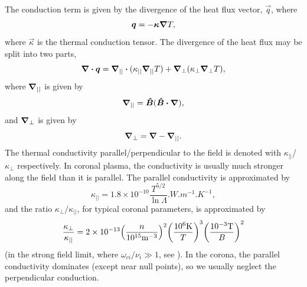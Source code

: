 The conduction term is given by the divergence of the heat flux vector, $\vec{q}$, where
\begin{equation}
    \boldsymbol{q}=-\boldsymbol{\kappa}\grad T,
\end{equation}
where $\vec{\kappa}$ is the thermal conduction tensor. The divergence of the heat flux may be split into two parts,
\begin{equation}
    \div\vec{q}=\grad_{||}\vdot(\kappa_{||}\grad_{||}T)+\grad_{\perp}(\kappa_\perp\grad_\perp T),
\end{equation}
where $\grad_{||}$ is given by
\begin{equation}
    \grad_{||}=\vec{\hat{B}}(\vec{\hat{B}}\vdot\grad),
\end{equation}
and $\grad_\perp$ is given by
\begin{equation}
    \grad_\perp = \grad - \grad_{||}.
\end{equation}
The thermal conductivity parallel/perpendicular to the field is denoted with $\kappa_{||}$/$\kappa_\perp$ respectively. In coronal plasma, the conductivity is usually much stronger along the field than it is parallel. The parallel conductivity is approximated by
\begin{equation}
    \kappa_{||}=1.8\times10^{-10}\frac{T^{5/2}}{\ln\Lambda}\si{.W.m^{-1}.K^{-1}},
\end{equation}
and the ratio $\kappa_\perp/\kappa_{||}$, for typical coronal parameters, is approximated by
\begin{equation}
    \frac{\kappa_\perp}{\kappa_{||}}=2\times10^{-13}\qty(\frac{n}{10^{15}\si{.m^{-3}}})^2\qty(\frac{10^6\si{.K}}{T})^3\qty(\frac{10^{-3}\si{.T}}{B})^2
\end{equation}
(in the strong field limit, where $\omega_{ci}/\nu_i\gg1$, see \citealt{Spitzer1965, Braginskii1965, Priest2014}). In the corona, the parallel conductivity dominates (except near null points), so we usually neglect the perpendicular conduction.


